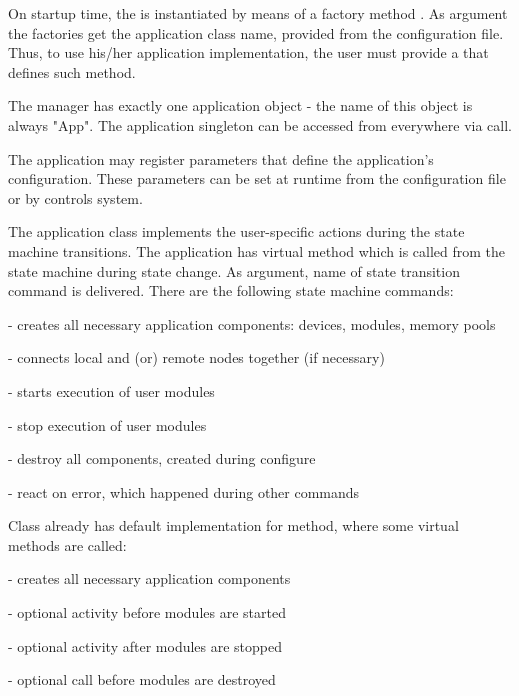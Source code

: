 On startup time, the  is instantiated
by means of a factory method .
As argument the factories get the application class name, 
provided from the configuration file.
Thus, to use his/her application implementation, 
the user must provide a  that defines such method.

The manager has exactly one application object - the name of this object is always "App".
The application singleton can be accessed from everywhere 
via  call. 

The application  may register parameters that 
define the application's configuration. These parameters can be set at 
runtime from the configuration file or by controls system.

The application class implements the user-specific actions during
the state machine transitions. The application has virtual method 
 which is called from the state machine during state change.
As argument, name of state transition command is delivered. 
There are the following state machine commands:

\bdes
\item[\keyw{dabc::Manager::stcmdDoConfigure}] - creates all necessary application components: devices, modules, memory pools
\item[\keyw{dabc::Manager::stcmdDoEnable}] - connects local and (or) remote nodes together (if necessary) 
\item[\keyw{dabc::Manager::stcmdDoStart}] - starts execution of user modules 
\item[\keyw{dabc::Manager::stcmdDoStop}] - stop execution of user modules
\item[\keyw{dabc::Manager::stcmdDoHalt}] - destroy all components, created during configure
\item[\keyw{dabc::Manager::stcmdDoError}] - react on error, which happened during other commands
\edes
  
Class  already has default implementation for
 method, where some virtual methods are called:

\bdes
\item[\func{CreateAppModules()}] - creates all necessary application components
\item[\func{BeforeAppModulesStarted()}] - optional activity before modules are started 
\item[\func{AfterAppModulesStopped()}] - optional activity after modules are stopped
\item[\func{BeforeAppModulesDestroyed()}] - optional call before modules are destroyed
\edes


